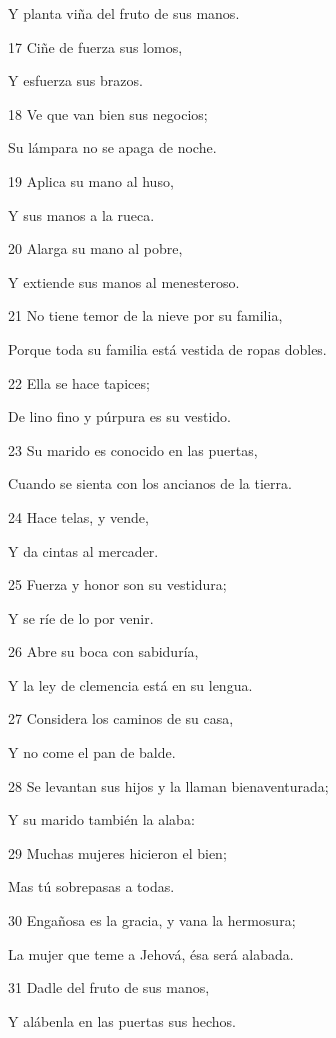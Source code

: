 \par Y planta viña del fruto de sus manos.
\par 17 Ciñe de fuerza sus lomos,
\par Y esfuerza sus brazos.
\par 18 Ve que van bien sus negocios;
\par Su lámpara no se apaga de noche.
\par 19 Aplica su mano al huso,
\par Y sus manos a la rueca.
\par 20 Alarga su mano al pobre,
\par Y extiende sus manos al menesteroso.
\par 21 No tiene temor de la nieve por su familia,
\par Porque toda su familia está vestida de ropas dobles.
\par 22 Ella se hace tapices;
\par De lino fino y púrpura es su vestido.
\par 23 Su marido es conocido en las puertas,
\par Cuando se sienta con los ancianos de la tierra.
\par 24 Hace telas, y vende,
\par Y da cintas al mercader.
\par 25 Fuerza y honor son su vestidura;
\par Y se ríe de lo por venir.
\par 26 Abre su boca con sabiduría, 
\par Y la ley de clemencia está en su lengua. 
\par 27 Considera los caminos de su casa,
\par Y no come el pan de balde.
\par 28 Se levantan sus hijos y la llaman bienaventurada; 
\par Y su marido también la alaba:
\par 29 Muchas mujeres hicieron el bien;
\par Mas tú sobrepasas a todas.
\par 30 Engañosa es la gracia, y vana la hermosura;
\par La mujer que teme a Jehová, ésa será alabada.
\par 31 Dadle del fruto de sus manos,
\par Y alábenla en las puertas sus hechos.


